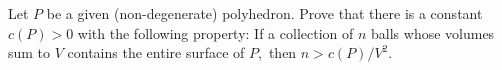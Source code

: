 Let $P$ be a given (non-degenerate) polyhedron. Prove that there is a constant $c(P)>0$ with the following property: If a collection of $n$ balls whose volumes sum to $V$ contains the entire surface of $P,$ then $n>c(P)/V^2.$